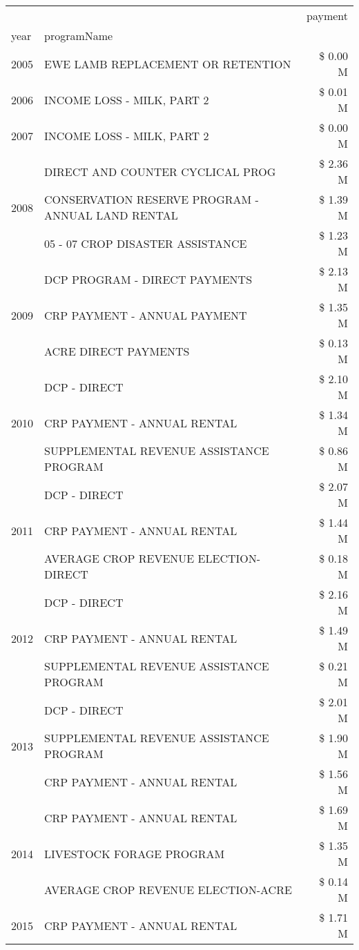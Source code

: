 \begin{tabular}{llr}
\toprule
 &  & payment \\
year & programName &  \\
\midrule
2005 & EWE LAMB REPLACEMENT OR RETENTION & \$ 0.00 M \\
\cline{1-3}
2006 & INCOME LOSS - MILK, PART 2 & \$ 0.01 M \\
\cline{1-3}
2007 & INCOME LOSS - MILK, PART 2 & \$ 0.00 M \\
\cline{1-3}
\multirow[t]{3}{*}{2008} & DIRECT AND COUNTER CYCLICAL PROG & \$ 2.36 M \\
 & CONSERVATION RESERVE PROGRAM - ANNUAL LAND RENTAL & \$ 1.39 M \\
 & 05 - 07 CROP DISASTER ASSISTANCE & \$ 1.23 M \\
\cline{1-3}
\multirow[t]{3}{*}{2009} & DCP PROGRAM - DIRECT PAYMENTS & \$ 2.13 M \\
 & CRP PAYMENT - ANNUAL PAYMENT & \$ 1.35 M \\
 & ACRE DIRECT PAYMENTS & \$ 0.13 M \\
\cline{1-3}
\multirow[t]{3}{*}{2010} & DCP - DIRECT & \$ 2.10 M \\
 & CRP PAYMENT - ANNUAL RENTAL & \$ 1.34 M \\
 & SUPPLEMENTAL REVENUE ASSISTANCE PROGRAM & \$ 0.86 M \\
\cline{1-3}
\multirow[t]{3}{*}{2011} & DCP - DIRECT & \$ 2.07 M \\
 & CRP PAYMENT - ANNUAL RENTAL & \$ 1.44 M \\
 & AVERAGE CROP REVENUE ELECTION-DIRECT & \$ 0.18 M \\
\cline{1-3}
\multirow[t]{3}{*}{2012} & DCP - DIRECT & \$ 2.16 M \\
 & CRP PAYMENT - ANNUAL RENTAL & \$ 1.49 M \\
 & SUPPLEMENTAL REVENUE ASSISTANCE PROGRAM & \$ 0.21 M \\
\cline{1-3}
\multirow[t]{3}{*}{2013} & DCP - DIRECT & \$ 2.01 M \\
 & SUPPLEMENTAL REVENUE ASSISTANCE PROGRAM & \$ 1.90 M \\
 & CRP PAYMENT - ANNUAL RENTAL & \$ 1.56 M \\
\cline{1-3}
\multirow[t]{3}{*}{2014} & CRP PAYMENT - ANNUAL RENTAL & \$ 1.69 M \\
 & LIVESTOCK FORAGE PROGRAM & \$ 1.35 M \\
 & AVERAGE CROP REVENUE ELECTION-ACRE & \$ 0.14 M \\
\cline{1-3}
\multirow[t]{3}{*}{2015} & CRP PAYMENT - ANNUAL RENTAL & \$ 1.71 M \\

\end{tabular}
